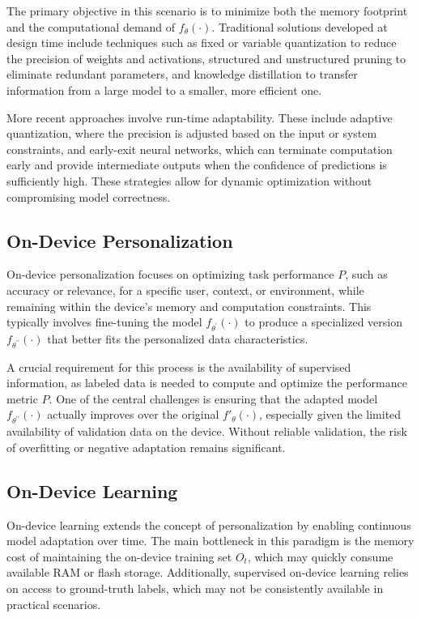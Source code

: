 The primary objective in this scenario is to minimize both the memory footprint and the computational demand of $f_\theta(\cdot)$. 
Traditional solutions developed at design time include techniques such as fixed or variable quantization to reduce the precision of weights and activations, structured and unstructured pruning to eliminate redundant parameters, and knowledge distillation to transfer information from a large model to a smaller, more efficient one. 

More recent approaches involve run-time adaptability. 
These include adaptive quantization, where the precision is adjusted based on the input or system constraints, and early-exit neural networks, which can terminate computation early and provide intermediate outputs when the confidence of predictions is sufficiently high. 
These strategies allow for dynamic optimization without compromising model correctness.

\subsection{On-Device Personalization}
On-device personalization focuses on optimizing task performance $P$, such as accuracy or relevance, for a specific user, context, or environment, while remaining within the device's memory and computation constraints. 
This typically involves fine-tuning the model $f_{\theta^\prime}(\cdot)$ to produce a specialized version $f_{\theta^{\prime\prime}}(\cdot)$ that better fits the personalized data characteristics.

A crucial requirement for this process is the availability of supervised information, as labeled data is needed to compute and optimize the performance metric $P$. 
One of the central challenges is ensuring that the adapted model $f_{\theta^{\prime\prime}}(\cdot)$ actually improves over the original $f'_\theta(\cdot)$, especially given the limited availability of validation data on the device. 
Without reliable validation, the risk of overfitting or negative adaptation remains significant.

\subsection{On-Device Learning}
On-device learning extends the concept of personalization by enabling continuous model adaptation over time. 
The main bottleneck in this paradigm is the memory cost of maintaining the on-device training set $O_t$, which may quickly consume available RAM or flash storage. 
Additionally, supervised on-device learning relies on access to ground-truth labels, which may not be consistently available in practical scenarios.

